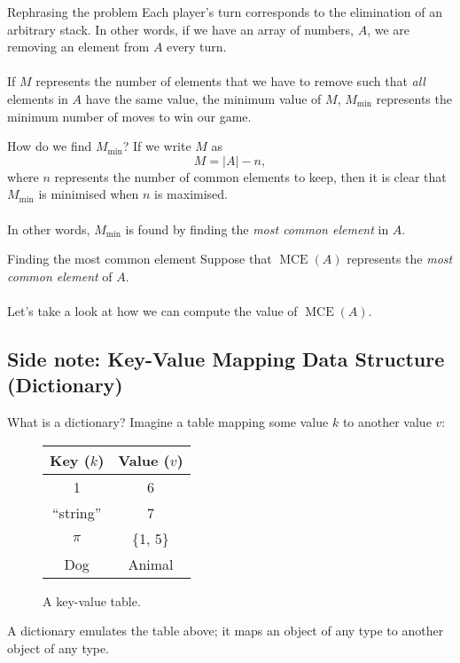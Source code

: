 \documentclass{beamer}
\DeclareMathOperator{\MCE}{MCE}
\begin{document}
\begin{frame}{Rephrasing the problem}
    Each player's turn corresponds to the elimination of an arbitrary stack. In other words, if we have an array of numbers, $A$, we are removing an element from $A$ every turn.\\~\\
    If $M$ represents the number of elements that we have to remove such that \textit{all} elements in $A$ have the same value, the minimum value of $M$, $M_{\min}$ represents the minimum number of moves to win our game.
\end{frame}

\begin{frame}[fragile]{How do we find $M_{\min}$?}
    If we write $M$ as $$M=|A|-n,$$ where $n$ represents the number of common elements to keep, then it is clear that $M_{\min}$ is minimised when $n$ is maximised.\\~\\
    In other words, $M_{\min}$ is found by finding the \textit{most common element} in $A$.
\end{frame}

\begin{frame}{Finding the most common element}
    Suppose that ${\MCE}(A)$ represents the \textit{most common element} of $A$.\\~\\
    Let's take a look at how we can compute the value of $\MCE(A)$.
\end{frame}

\subsection{Side note: Key-Value Mapping Data Structure (Dictionary)}
\begin{frame}{What is a dictionary?}
    Imagine a table mapping some value $k$ to another value $v$:
    \begin{figure}
        \centering
        \begin{tabular}{c|c}
            Key ($k$) & Value ($v$)  \\\hline
            1 & 6 \\
            ``string'' & 7\\
            $\pi$ & \{1, 5\}\\
            Dog & Animal
        \end{tabular}
        \caption{A key-value table.}
    \end{figure}
    A dictionary emulates the table above; it maps an object of any type to another object of any type.
\end{frame}
\end{document}

